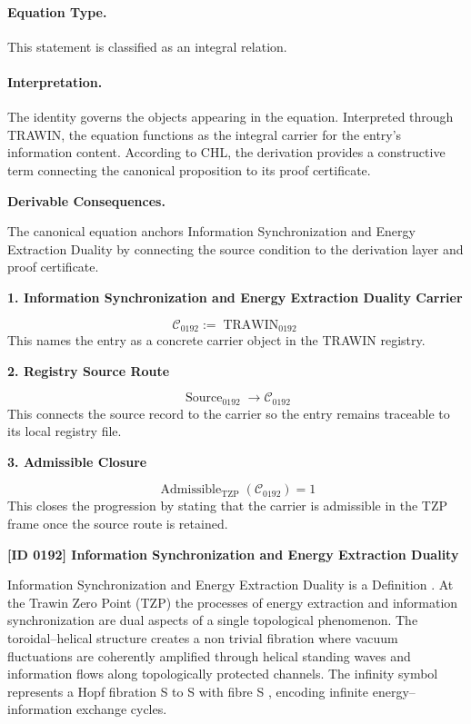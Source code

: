 \paragraph{Equation Type.}
This statement is classified as an integral relation.

\paragraph{Interpretation.}
The identity governs the objects appearing in the equation. Interpreted through TRAWIN, the equation functions as the integral carrier for the entry’s information content. According to CHL, the derivation provides a constructive term connecting the canonical proposition to its proof certificate.

\par\vspace{0.35em}
\noindent\textbf{Derivable Consequences.}\quad
\begingroup
\footnotesize
\raggedright
The canonical equation anchors Information Synchronization and Energy Extraction Duality by connecting the source condition to the derivation layer and proof certificate.
\par\endgroup

\noindent\textbf{1. Information Synchronization and Energy Extraction Duality Carrier}\par
\[
\mathcal{C}_{0192} := \operatorname{TRAWIN}_{0192}
\]
\noindent This names the entry as a concrete carrier object in the TRAWIN registry.\par
\noindent\textbf{2. Registry Source Route}\par
\[
\operatorname{Source}_{0192}\longrightarrow \mathcal{C}_{0192}
\]
\noindent This connects the source record to the carrier so the entry remains traceable to its local registry file.\par
\noindent\textbf{3. Admissible Closure}\par
\[
\operatorname{Admissible}_{\mathrm{TZP}}\!\left(\mathcal{C}_{0192}\right)=1
\]
\noindent This closes the progression by stating that the carrier is admissible in the TZP frame once the source route is retained.\par

\clearpage
\noindent\textbf{[ID 0192] Information Synchronization and Energy Extraction Duality}\par
\vspace{0.35em}
\begingroup\small
{}
Information Synchronization and Energy Extraction Duality is a Definition  . At the Trawin Zero Point (TZP) the processes of energy extraction and information synchronization are dual aspects of a single topological phenomenon. The toroidal--helical structure creates a non trivial fibration where vacuum fluctuations are coherently amplified through helical standing waves and information flows along topologically protected channels. The infinity symbol represents a Hopf fibration S  to S  with fibre S , encoding infinite energy--information exchange cycles.

